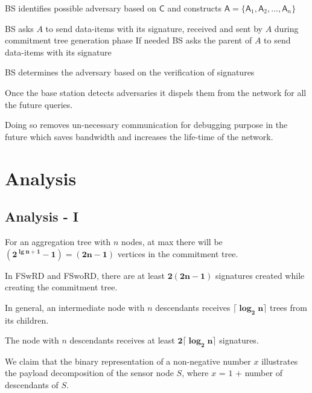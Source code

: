 \documentclass[%
  slidesonly,%
  semlayer%
  ]{seminar}                                  %
\begin{document}
\begin{slide}
\begin{algorithm}
\begin{algorithmic}[1]
            \ENDFOR

            \STATE BS identifies possible adversary based on $\textsf{C}$ and constructs $\textsf{A} = \{\textsf{A}_{1},\textsf{A}_{2},\dotsc,\textsf{A}_{n}\}$


              \STATE BS asks $A$ to send data-items with its signature, received and sent by $A$ during commitment tree generation phase
              \STATE If needed BS  asks the parent of $A$ to send data-items with its signature
        
            \ENDFOR

            \STATE BS determines the adversary based on the verification of signatures

          \end{algorithmic}
        \end{algorithm}

        Once the base station detects adversaries it dispels them from the network for all the future queries.

        Doing so removes un-necessary communication for debugging purpose in the future which saves bandwidth and increases the life-time of the network.        
        \vfill
        \clearpage

\section*{Analysis}
    \subsection*{Analysis - I}
        \vfill
        For an aggregation tree with $n$ nodes, at max there will be $\mathbf{(2^{\lg n + 1} - 1) = (2n-1)}$ vertices in the commitment tree.

        In FSwRD and FSwoRD, there are at least $\mathbf{2(2n-1)}$ signatures created while creating the commitment tree.

        In general, an intermediate node with $n$ descendants receives $\mathbf{\lceil \log_2 n \rceil}$ trees from its children.
        
        The node with $n$ descendants receives at least $\mathbf{2 \lceil \log_2 n \rceil} $ signatures.

        We claim that the binary representation of a non-negative number $x$ illustrates the payload decomposition of the sensor node $S$, where $x$ = $1$ + number of descendants of $S$.


\end{slide}
\end{document}
